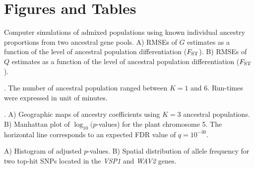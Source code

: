 
\section{Figures and Tables}


 Computer simulations of admixed populations using known individual ancestry proportions from two ancestral gene pools. A) RMSEs of $G$ estimates as a function of the level of ancestral population differentiation ($F_{\rm ST}$). B) RMSEs of $Q$ estimates as a function of the level of ancestral population differentiation ($F_{\rm ST}$).

\vspace{1cm}

. The number of ancestral population ranged between $K = 1$ and $6$. Run-times were expressed in unit of minutes.

\vspace{1cm}

. A) Geographic maps of ancestry coefficients using $K = 3$ ancestral populations. B) Manhattan plot of $\log_{10}(p$-values) for the plant chromosome 5. The horizontal line corresponds to an expected FDR value of $q = 10^{-30}$. 

\vspace{1cm}

 A) Histogram of adjusted $p$-values. B) Spatial distribution of allele frequency for two top-hit SNPs located in the {\it VSP1} and {\it WAV2} genes.

\vspace{1cm}




\clearpage
\newpage




